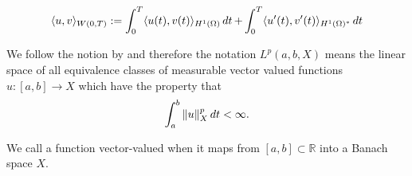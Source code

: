 \begin{equation*}
    \langle u, v \rangle_{W(0,T)} := \int_{0}^T\langle u(t),v(t) \rangle _{H^{1}(\Omega)}\mathop{dt}  +  \int_{0}^T \langle u'(t), v'(t) \rangle_{H^{1}(\Omega)^{*}}\mathop{dt} 
\end{equation*}

We follow the notion by \cite{optimalControl} and therefore the notation $L^{p}(a,b,X)$ means the linear space of all equivalence classes of measurable vector valued functions $u:[a,b] \rightarrow X$ which have the property that
\begin{equation*}
    \int_{a}^b\|u\|_X^p \mathop{dt}<\infty.
\end{equation*}

We call a function vector-valued when it maps from $[a,b] \subset \mathbb{R}$ into a Banach space $X$. 

